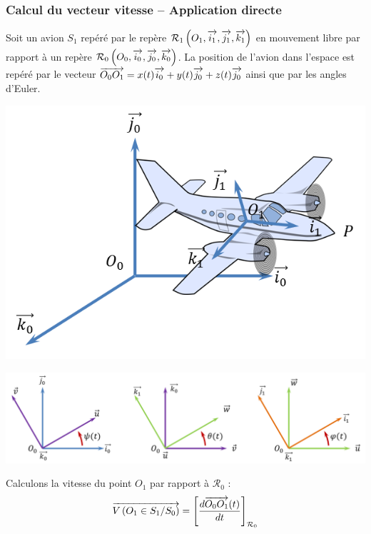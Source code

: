\documentclass[10pt,oneside]{article}
\begin{document}
\subsubsection{Calcul du vecteur vitesse -- Application directe}

Soit un avion $S_1$ repéré par le repère $\mathcal{R}_1\left(O_1,\overrightarrow{i_1},\overrightarrow{j_1},\overrightarrow{k_1} \right)$ en mouvement libre par rapport à un repère $\mathcal{R}_0\left(O_0,\overrightarrow{i_0},\overrightarrow{j_0},\overrightarrow{k_0} \right)$.  La position de l'avion dans l'espace est repéré par le vecteur $\overrightarrow{O_0O_1}=x(t)\overrightarrow{i_0}+y(t)\overrightarrow{j_0}+z(t)\overrightarrow{j_0}$ ainsi que par les angles d'Euler.

\begin{minipage}[c]{.3\linewidth}
\begin{center}
\includegraphics[width=.95\textwidth]{png/cessna}
\end{center}
\end{minipage}\hfill
\begin{minipage}[c]{.65\linewidth}
\begin{center}
\includegraphics[width=.95\textwidth]{png/euler}
\end{center}
\end{minipage}


Calculons la vitesse du point $O_1$ par rapport à $\mathcal{R}_0$ :
$$
\overrightarrow{V\left( {O_1} \in {S_1}/{S_0}\right)} =  \left[\dfrac{d\overrightarrow{O_0 O_1}(t)}{dt}\right]_{\mathcal{R}_0} 
$$
\end{document}
